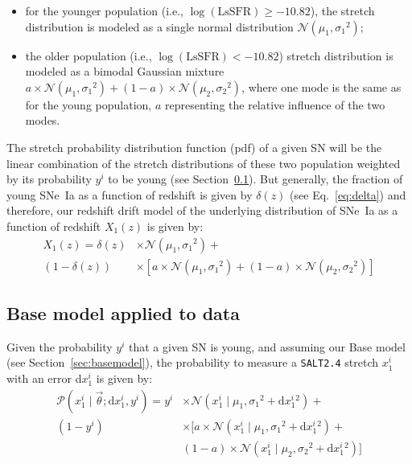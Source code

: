 \documentclass[]{aa}
\newcommand{\prob}[2]{\mathcal{P}\left( #1 \mid #2\right)}
\begin{document}
\begin{itemize}
    \item for the younger population (i.e., $\log(\mathrm{LsSFR})\geq-10.82$),
        the stretch distribution is modeled as a single normal distribution
        $\mathcal{N}(\mu_1, \sigma_1{}^2)$; 
    \item the older population (i.e., $\log( \mathrm{LsSFR})<-10.82$) stretch
        distribution is modeled as a bimodal Gaussian mixture $a\times
        \mathcal{N}(\mu_1, \sigma_1{}^2) + (1-a)\times \mathcal{N}(\mu_2,
        \sigma_2{}^2)$, where one mode is the same as for the young population,
        $a$ representing the relative influence of the two modes.
\end{itemize}

The stretch probability distribution function (pdf) of a given SN will be the
linear combination of the stretch distributions of these two population weighted
by its probability $y^i$ to be young (see Section~\ref{sec:basemodelapplied}).
But generally, the fraction of young SNe~Ia as a function of redshift is given
by $\delta(z)$ (see Eq.~\ref{eq:delta}) and therefore, our redshift drift model
of the underlying distribution of SNe~Ia as a function of redshift $X_1(z)$ is
given by:
\begin{align}\label{eq:stretchz}
    X_1(z) = \delta(z)&\times \mathcal{N}(\mu_1,\sigma_1{}^2) + \nonumber \\
    (1-\delta(z))&\times \left[ a\times\mathcal{N}(\mu_1,\sigma_1{}^2) +
    (1-a)\times\mathcal{N}(\mu_2,\sigma_2{}^2) \right]
\end{align}

\subsection{Base model applied to data}\label{sec:basemodelapplied}

Given the probability $y^i$ that a given SN is young, and assuming our Base
model (see Section~\ref{sec:basemodel}), the probability to measure a
\textsc{\texttt{SALT2.4}} stretch $x_1^i$ with an error d$x_1^i$ is given by:
\begin{align}\label{eq:likelihoodsnf}
    \prob{x^i_1}{\vec{\theta}; \mathrm{d}x^i_1, y^i} =
    y^i & \times
    \mathcal{N}\left(x^i_1 \mid \mu_1, \sigma_1{}^2+\mathrm{d}x^i_1{}^2\right) +
    \nonumber\\
    (1-y^i) &\times \bigg[
    a \times \mathcal{N}\left(x^i_1 \mid \mu_1,
    \sigma_1{}^2+\mathrm{d}x^i_1{}^2\right) +
    \nonumber\\
    & (1-a) \times \mathcal{N}\left(x^i_1 \mid \mu_2,
    \sigma_2{}^{2}+\mathrm{d}x^i_1{}^2\right) \bigg]
\end{align}
\end{document}
